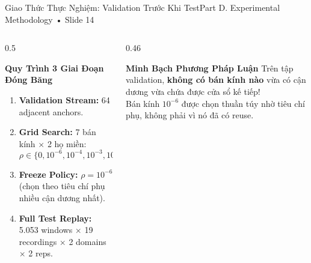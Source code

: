 \documentclass[aspectratio=169, 10pt]{beamer}
\begin{document}
\begin{frame}{Giao Thức Thực Nghiệm: Validation Trước Khi Test}{Part D. Experimental Methodology • Slide 14}
    \begin{columns}
        \begin{column}{0.5\textwidth}
            \begin{block}{\textbf{Quy Trình 3 Giai Đoạn Đóng Băng}}
                \footnotesize
                \begin{enumerate}
                    \item \textbf{Validation Stream:} 64 adjacent anchors.
                    \item \textbf{Grid Search:} 7 bán kính $\times$ 2 họ miền:
                    $$\rho \in \{0, 10^{-6}, 10^{-4}, 10^{-3}, 10^{-2}, 10^{-1}, 1\}$$
                    \item \textbf{Freeze Policy:} $\rho = 10^{-6}$ (chọn theo tiêu chí phụ nhiều cận dương nhất).
                    \item \textbf{Full Test Replay:} 5.053 windows $\times$ 19 recordings $\times$ 2 domains $\times$ 2 reps.
                \end{enumerate}
            \end{block}
        \end{column}
        \begin{column}{0.46\textwidth}
            \begin{alertblock}{\textbf{Minh Bạch Phương Pháp Luận}}
                \footnotesize
                Trên tập validation, \textbf{không có bán kính nào} vừa có cận dương vừa chứa được cửa sổ kế tiếp!
                \\ Bán kính $10^{-6}$ được chọn thuần túy nhờ tiêu chí phụ, không phải vì nó đã có reuse.
            \end{alertblock}
        \end{column}
    \end{columns}
\end{frame}
\end{document}
